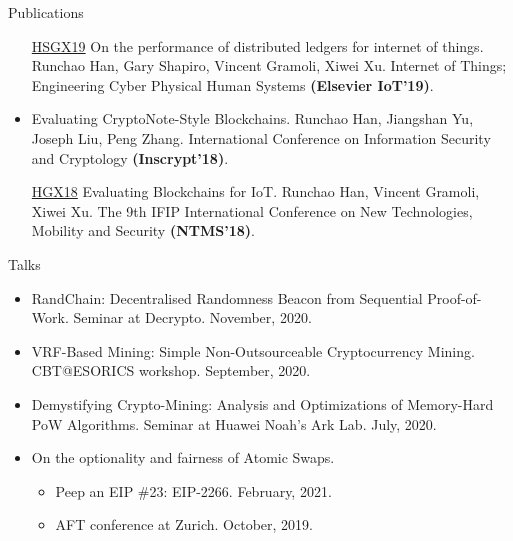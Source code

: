 \documentclass{resume} %
\begin{document}
\begin{rSection}{Publications}
\begin{itemize}
        \item[\href{https://gramoli.redbellyblockchain.io/web/doc/pubs/IoT2019.pdf}{HSGX19}] On the performance of distributed ledgers for internet of things. Runchao Han, Gary Shapiro, Vincent Gramoli, Xiwei Xu. Internet of Things; Engineering Cyber Physical Human Systems \textbf{(Elsevier IoT'19)}.
        \item[\href{https://www.researchgate.net/profile/Runchao_Han/publication/331227984_Evaluating_CryptoNote-Style_Blockchains_14th_International_Conference_Inscrypt_2018_Fuzhou_China_December_14-17_2018_Revised_Selected_Papers/links/5c747901299bf1268d25a5f5/Evaluating-CryptoNote-Style-Blockchains-14th-International-Conference-Inscrypt-2018-Fuzhou-China-December-14-17-2018-Revised-Selected-Papers.pdf}{HYLZ18}] Evaluating CryptoNote-Style Blockchains. Runchao Han, Jiangshan Yu, Joseph Liu, Peng Zhang. International Conference on Information Security and Cryptology \textbf{(Inscrypt'18)}.
        \item[\href{https://gramoli.redbellyblockchain.io/web/doc/pubs2/blockchain-iot.pdf}{HGX18}] Evaluating Blockchains for IoT. Runchao Han, Vincent Gramoli, Xiwei Xu. The 9th IFIP International Conference on New Technologies, Mobility and Security \textbf{(NTMS'18)}.
    \end{itemize}
\end{rSection}

\begin{rSection}{Talks}
    \begin{itemize}
        \item RandChain: Decentralised Randomness Beacon from Sequential Proof-of-Work. Seminar at Decrypto. November, 2020.
        \item VRF-Based Mining: Simple Non-Outsourceable Cryptocurrency Mining. CBT@ESORICS workshop. September, 2020.
        \item Demystifying Crypto-Mining: Analysis and Optimizations of Memory-Hard PoW Algorithms. Seminar at Huawei Noah's Ark Lab. July, 2020.
        \item On the optionality and fairness of Atomic Swaps.
              \begin{itemize}
                  \item Peep an EIP \#23: EIP-2266. February, 2021.
                  \item AFT conference at Zurich. October, 2019.
              \end{itemize}
    \end{itemize}
\end{rSection}
\end{document}

